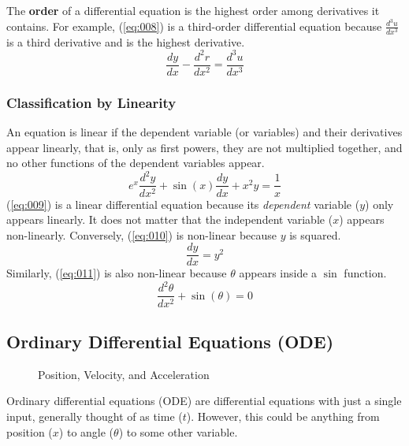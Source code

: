 \documentclass[12pt]{article}
\begin{document}
The \textbf{order} of a differential equation is the highest order among derivatives it contains. For example, (\ref{eq:008}) is a third-order differential equation because $\frac{d^3u}{dx^3}$ is a third derivative and is the highest derivative.
\begin{equation}
  \frac{dy}{dx} - \frac{d^2r}{dx^2} = \frac{d^3u}{dx^3}
  \label{eq:008}
\end{equation}

\subsubsection{Classification by Linearity}
\label{sssec:classificationByLinearity}

An equation is linear if the dependent variable (or variables) and their derivatives appear linearly, that is, only as first powers, they are not multiplied together, and no other functions of the dependent variables appear.
\begin{equation}
  e^x \frac{d^2y}{dx^2} + \sin(x) \frac{dy}{dx} + x^2y = \frac{1}{x}
  \label{eq:009}
\end{equation}
(\ref{eq:009}) is a linear differential equation because its \textit{dependent} variable ($y$) only appears linearly. It does not matter that the independent variable ($x$) appears non-linearly. Conversely, (\ref{eq:010}) is non-linear because $y$ is squared.
\begin{equation}
  \frac{dy}{dx} = y^2
  \label{eq:010}
\end{equation}
Similarly, (\ref{eq:011}) is also non-linear because $\theta$ appears inside a $\sin$ function.
\begin{equation}
  \frac{d^2\theta}{dx^2} + \sin(\theta) = 0
  \label{eq:011}
\end{equation}

\subsection{Ordinary Differential Equations (ODE)}
\label{ssec:ordinaryDifferentialEquations}

\begin{wrapfigure}[14]{r}{0.45\textwidth}
  \centering
  \vspace{-15pt}
  
  \caption{Position, Velocity, and Acceleration}
  \label{fig:001}
\end{wrapfigure}

Ordinary differential equations (ODE) are differential equations with just a single input, generally thought of as time ($t$). However, this could be anything from position ($x$) to angle ($\theta$) to some other variable.
\end{document}
